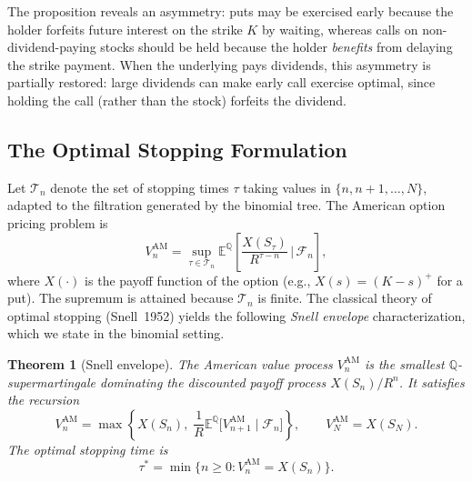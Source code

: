 \documentclass[11pt,a4paper]{article}
\theoremstyle{plain}
\newtheorem{theorem}{Theorem}[section]
\theoremstyle{definition}
\newcommand{\E}{\mathbb{E}}
\newcommand{\Q}{\mathbb{Q}}
\begin{document}
The proposition reveals an asymmetry: puts may be exercised early because
the holder forfeits future interest on the strike $K$ by waiting, whereas
calls on non-dividend-paying stocks should be held because the holder
\emph{benefits} from delaying the strike payment. When the underlying
pays dividends, this asymmetry is partially restored: large dividends
can make early call exercise optimal, since holding the call (rather than
the stock) forfeits the dividend.

\subsection{The Optimal Stopping Formulation}
\label{subsec:optimal-stopping}

Let $\mathcal{T}_n$ denote the set of stopping times $\tau$ taking values
in $\{n, n+1, \dots, N\}$, adapted to the filtration generated by the
binomial tree. The American option pricing problem is
\begin{equation}
    \label{eq:optimal-stopping}
    V_n^{\mathrm{AM}} = \sup_{\tau \in \mathcal{T}_n}
        \E^{\Q}\!\left[ \frac{X(S_\tau)}{R^{\tau - n}} \,\Big|\, \mathcal{F}_n \right],
\end{equation}
where $X(\cdot)$ is the payoff function of the option (e.g.,
$X(s) = (K - s)^+$ for a put). The supremum is attained because
$\mathcal{T}_n$ is finite. The classical theory of optimal stopping
(Snell~1952) yields the following \emph{Snell envelope} characterization,
which we state in the binomial setting.

\begin{theorem}[Snell envelope]
\label{thm:snell}
The American value process $V_n^{\mathrm{AM}}$ is the smallest
$\Q$-supermartingale dominating the discounted payoff process
$X(S_n)/R^n$. It satisfies the recursion
\begin{equation}
    \label{eq:american-recursion}
    V_n^{\mathrm{AM}} = \max\!\left\{
        X(S_n),\;
        \frac{1}{R}\E^{\Q}\bigl[V_{n+1}^{\mathrm{AM}} \mid \mathcal{F}_n\bigr]
    \right\}, \qquad V_N^{\mathrm{AM}} = X(S_N).
\end{equation}
The optimal stopping time is
\begin{equation}
    \label{eq:optimal-tau}
    \tau^* = \min\bigl\{ n \geq 0 : V_n^{\mathrm{AM}} = X(S_n) \bigr\}.
\end{equation}
\end{theorem}
\end{document}
